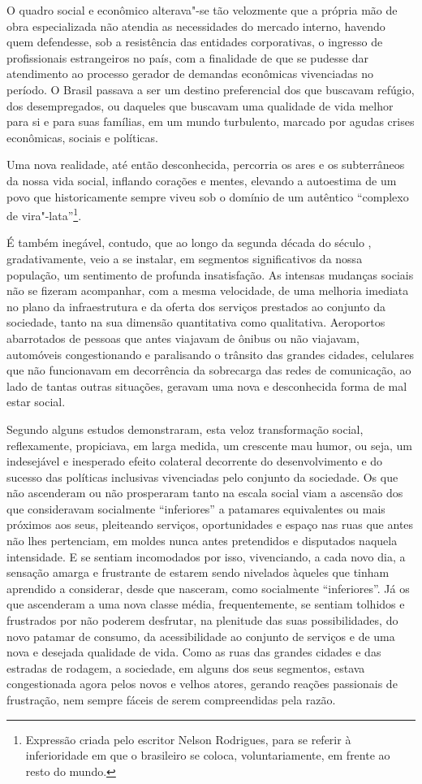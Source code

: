 O quadro social e econômico alterava"-se tão velozmente que a própria mão
de obra especializada não atendia as necessidades do mercado interno,
havendo quem defendesse, sob a resistência das entidades corporativas, o
ingresso de profissionais estrangeiros no país, com a finalidade de que
se pudesse dar atendimento ao processo gerador de demandas econômicas
vivenciadas no período. O Brasil passava a ser um destino preferencial
dos que buscavam refúgio, dos desempregados, ou daqueles que buscavam
uma qualidade de vida melhor para si e para suas famílias, em um mundo
turbulento, marcado por agudas crises econômicas, sociais e políticas.

Uma nova realidade, até então desconhecida, percorria os ares e os
subterrâneos da nossa vida social, inflando corações e mentes, elevando
a autoestima de um povo que historicamente sempre viveu sob o domínio de
um autêntico ``complexo de vira"-lata''\footnote{Expressão criada
  pelo escritor Nelson Rodrigues, para se referir à inferioridade em que
  o brasileiro se coloca, voluntariamente, em frente ao resto do mundo.}.

É também inegável, contudo, que ao longo da segunda década do século
, gradativamente, veio a se instalar, em segmentos significativos da
nossa população, um sentimento de profunda insatisfação. As intensas
mudanças sociais não se fizeram acompanhar, com a mesma velocidade, de
uma melhoria imediata no plano da infraestrutura e da oferta dos
serviços prestados ao conjunto da sociedade, tanto na sua dimensão
quantitativa como qualitativa. Aeroportos abarrotados de pessoas que
antes viajavam de ônibus ou não viajavam, automóveis congestionando e
paralisando o trânsito das grandes cidades, celulares que não
funcionavam em decorrência da sobrecarga das redes de comunicação, ao
lado de tantas outras situações, geravam uma nova e desconhecida forma
de mal estar social.

Segundo alguns estudos demonstraram, esta veloz transformação social,
reflexamente, propiciava, em larga medida, um crescente mau humor, ou
seja, um indesejável e inesperado efeito colateral decorrente do
desenvolvimento e do sucesso das políticas inclusivas vivenciadas pelo
conjunto da sociedade. Os que não ascenderam ou não prosperaram tanto na
escala social viam a ascensão dos que consideravam socialmente
``inferiores'' a patamares equivalentes ou mais próximos aos seus,
pleiteando serviços, oportunidades e espaço nas ruas que antes não lhes
pertenciam, em moldes nunca antes pretendidos e disputados naquela
intensidade. E se sentiam incomodados por isso, vivenciando, a cada novo
dia, a sensação amarga e frustrante de estarem sendo nivelados àqueles
que tinham aprendido a considerar, desde que nasceram, como socialmente
``inferiores''. Já os que ascenderam a uma nova classe média,
frequentemente, se sentiam tolhidos e frustrados por não poderem
desfrutar, na plenitude das suas possibilidades, do novo patamar de
consumo, da acessibilidade ao conjunto de serviços e de uma nova e
desejada qualidade de vida. Como as ruas das grandes cidades e das
estradas de rodagem, a sociedade, em alguns dos seus segmentos, estava
congestionada agora pelos novos e velhos atores, gerando reações
passionais de frustração, nem sempre fáceis de serem compreendidas pela
razão.

